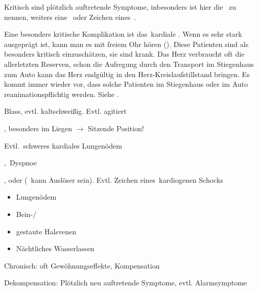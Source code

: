 {\begin{ABCDEText}
  Kritisch sind plötzlich auftretende Symptome, inbesonders ist hier die
  {\RedFlag}\, zu nennen, weiters eine
  {\RedFlag}\, oder Zeichen
  eines {\RedFlag}\,.
  
  Eine besonders kritische
  Komplikation ist das {\RedFlag}\,kardiale .
  Wenn es sehr stark ausgeprägt ist, kann man es mit freiem
  Ohr hören (). Diese
  Patienten sind als besonders kritisch einzuschätzen, sie
  sind  krank. Das Herz verbraucht oft die
  allerletzten Reserven, schon die Aufregung durch den
  Transport im Stiegenhaus zum Auto kann das Herz endgültig in
  den Herz-Kreislaufstillstand bringen. Es kommt immer wieder
  vor, dass solche Patienten im Stiegenhaus oder im Auto
  reanimationspflichtig werden. Siehe 
  .
\end{ABCDEText}
}
{

\begin{ABCDESlide}
  \item[\ABCDE{2}] Blass, evtl. kaltschweißig. Evtl.
  agitiert
  \item[\ABCDE{4}] , besonders im Liegen
  $\rightarrow$ Sitzende Position!
  
  Evtl. {\RedFlag}\,schweres kardiales Lungenödem 
  \item[\ABCDE{B}] , 
  {\RedFlag}\,Dyspnoe
  \item[\ABCDE{C}] ,  oder 
  (\, kann Auslöser sein). Evtl. Zeichen eines {\RedFlag}\,kardiogenen Schocks
  \item[\ABCDE{\ldots}] 
  \begin{itemize}
    \item Lungenödem
    \item {Bein-}/
    \item {gestaute Halsvenen}
    \item Nächtliches Wasserlassen
  \end{itemize}
  \item[\ABCDE{=}]
  \begin{compactitem}
    \item Chronisch: oft Gewöhnungseffekte, Kompensation
    \item Dekompensation: Plötzlich neu auftretende
    Symptome, evtl. Alarmsymptome
  \end{compactitem}
\end{ABCDESlide}


}
{}
{}
{}





